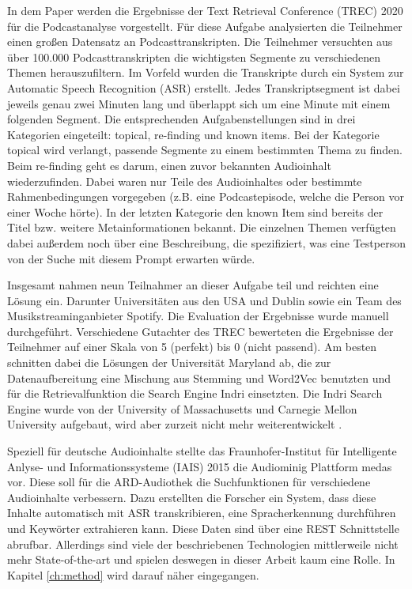 In dem Paper \cite{jones2021} werden die Ergebnisse der Text Retrieval Conference (TREC) 2020 für die Podcastanalyse vorgestellt.
Für diese Aufgabe analysierten die Teilnehmer einen großen Datensatz an Podcasttranskripten.
Die Teilnehmer versuchten aus über 100.000 Podcasttranskripten die wichtigsten Segmente zu verschiedenen Themen herauszufiltern.
Im Vorfeld wurden die Transkripte durch ein System zur Automatic Speech Recognition (ASR) erstellt.
Jedes Transkriptsegment ist dabei jeweils genau zwei Minuten lang und überlappt sich um eine Minute mit einem folgenden Segment.
Die entsprechenden Aufgabenstellungen sind in drei Kategorien eingeteilt: topical, re-finding und known items.
Bei der Kategorie topical wird verlangt, passende Segmente zu einem bestimmten Thema zu finden.
Beim re-finding geht es darum, einen zuvor bekannten Audioinhalt wiederzufinden.
Dabei waren nur Teile des Audioinhaltes oder bestimmte Rahmenbedingungen vorgegeben (z.B. eine Podcastepisode, welche die Person vor einer Woche hörte).
In der letzten Kategorie den known Item sind bereits der Titel bzw. weitere Metainformationen bekannt.
Die einzelnen Themen verfügten dabei außerdem noch über eine Beschreibung, die spezifiziert, was eine Testperson von der Suche mit diesem Prompt erwarten würde.


Insgesamt nahmen neun Teilnahmer an dieser Aufgabe teil und reichten eine Lösung ein.
Darunter Universitäten aus den USA und Dublin sowie ein Team des Musikstreaminganbieter Spotify.
Die Evaluation der Ergebnisse wurde manuell durchgeführt.
Verschiedene Gutachter des TREC bewerteten die Ergebnisse der Teilnehmer auf einer Skala von 5 (perfekt) bis 0 (nicht passend).
Am besten schnitten dabei die Lösungen der Universität Maryland ab, die zur Datenaufbereitung eine Mischung aus Stemming und Word2Vec benutzten und für die Retrievalfunktion die Search Engine Indri einsetzten.
Die Indri Search Engine wurde von der University of Massachusetts und Carnegie Mellon University aufgebaut, wird aber zurzeit nicht mehr weiterentwickelt \cite{lemur}.


Speziell für deutsche Audioinhalte stellte das Fraunhofer-Institut für Intelligente Anlyse- und Informationssysteme (IAIS) 2015 die Audiominig Plattform medas vor.
Diese soll für die ARD-Audiothek die Suchfunktionen für verschiedene Audioinhalte verbessern.
Dazu erstellten die Forscher ein System, dass diese Inhalte automatisch mit ASR transkribieren, eine Spracherkennung durchführen und Keywörter extrahieren kann.
Diese Daten sind über eine REST Schnittstelle abrufbar.
Allerdings sind viele der beschriebenen Technologien mittlerweile nicht mehr State-of-the-art und spielen deswegen in dieser Arbeit kaum eine Rolle.
In Kapitel \autoref{ch:method} wird darauf näher eingegangen.
\cite{maroni2020}
